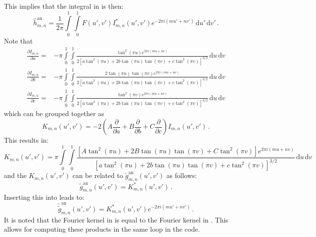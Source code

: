 This implies that the integral in  is then:
\begin{equation}
 \hat{h}^\textrm{an}_{m,n} =
 \frac{1}{2 \pi}
 \int\limits_0^1 \int\limits_0^1
   F(u',v') I_{m,n}^{*}(u',v') e^{-2 \pi i (m u' + n v')}
   \,\mathrm{d}u' \,\mathrm{d}v' \label{eqn:imn_ft} \, .
\end{equation}
%
Note that
\begin{align}
  \frac{\partial I_{m,n}}{\partial a}
  =& -\pi \int\limits_0^1 \int\limits_0^1
       \frac{           \tan^2(\pi u)                                                 e^{2 \pi i (m u + n v)}}
            {2 \left[ a \tan^2(\pi u) + 2 b \tan(\pi u) \tan(\pi v) + c \tan^2(\pi v) \right]^{3/2}          }
     \,\mathrm{d}u \,\mathrm{d}v \nonumber \\
  \frac{\partial I_{m,n}}{\partial b}
  =& -\pi \int\limits_0^1 \int\limits_0^1
       \frac{                           2   \tan(\pi u) \tan(\pi v)                   e^{2 \pi i (m u + n v)}}
            {2 \left[ a \tan^2(\pi u) + 2 b \tan(\pi u) \tan(\pi v) + c \tan^2(\pi v) \right]^{3/2}          }
     \,\mathrm{d}u \,\mathrm{d}v \\
  \frac{\partial I_{m,n}}{\partial c}
  =& -\pi \int\limits_0^1 \int\limits_0^1
       \frac{                                                           \tan^2(\pi v) e^{2 \pi i (m u + n v)}}
            {2 \left[ a \tan^2(\pi u) + 2 b \tan(\pi u) \tan(\pi v) + c \tan^2(\pi v) \right]^{3/2}          }
     \,\mathrm{d}u \,\mathrm{d}v \nonumber
\end{align}
which can be grouped together as
\begin{equation}
  K_{m,n}(u',v') =
    -2 \left( A \frac{\partial}{\partial a}
             +B \frac{\partial}{\partial b}
             +C \frac{\partial}{\partial c} \right) I_{m,n}(u',v') \, . \label{eqn:Kmn}
\end{equation}
This results in:
\begin{equation}
  K_{m,n}(u',v') =
  \pi \int\limits_0^1 \int\limits_0^1
        \frac{\left[A \tan^2(\pi u) + 2 B \tan(\pi u) \tan(\pi v) + C \tan^2(\pi v) \right] e^{2 \pi i (m u + n v)}}
             {\left[a \tan^2(\pi u) + 2 b \tan(\pi u) \tan(\pi v) + c \tan^2(\pi v) \right]^{3/2}                  }
        \,\mathrm{d}u \,\mathrm{d}v
\end{equation}
and the $K_{m,n}(u',v')$ can be related to $\tilde{g}^\mathrm{an}_{m,n}(u',v')$ as follows:
\begin{equation}
  \tilde{g}^\mathrm{an}_{m,n}(u',v')
  = K_{m,n}^{*}(u',v') \, .
\end{equation}
Inserting this into  leads to:
\begin{equation}
 \tilde{\tilde{g}}^\mathrm{an}_{m,n}(u',v')
 = K_{m,n}^{*}(u',v') e^{-2 \pi i (m u' + n v')} \label{eqn:g_t_an} \, .
\end{equation}
It is noted that the Fourier kernel in 
is equal to the Fourier kernel in .
This allows for computing these products
in the same loop in the code.

